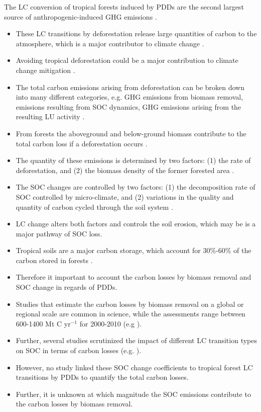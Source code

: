 	The \ac{LC} conversion of tropical forests induced by \acp{PDD} are the second largest source of anthropogenic-induced \ac{GHG} emissions \citep{Don2010}. 
	\begin{itemize}
		\item These \ac{LC} transitions by deforestation release large quantities of carbon to the atmosphere, which is a major contributor to climate change .
		\item Avoiding tropical deforestation could be a major contribution to climate change mitigation \citep{Don2010}.
		\item The total carbon emissions arising from deforestation can be broken down into many different categories, e.g. \ac{GHG} emissions from biomass removal, emissions resulting from \ac{SOC} dynamics, \ac{GHG} emissions arising from the resulting \ac{LU} activity \citep{Avitabile2016}.
		\item From forests the aboveground and below-ground biomass contribute to the total carbon loss if a deforestation occurs .
		\item The quantity of these emissions is determined by two factors: (1) the rate of deforestation, and (2) the biomass density of the former forested area \citep{Houghton2012a}.
		\item The \ac{SOC} changes are controlled by two factors: (1) the decomposition rate of \ac{SOC} controlled by micro-climate, and (2) variations in the quality and quantity of carbon cycled through the soil system \citep{Don2010}.
		\item \ac{LC} change alters both factors and controls the soil erosion, which may be is a major pathway of \ac{SOC} loss.
		\item Tropical soils are a major carbon storage, which account for 30\%-60\% of the carbon stored in forests \citep{Don2010}.
		\item Therefore it important to account the carbon losses by biomass removal and \ac{SOC} change in regards of \acp{PDD}.
		\item Studies that estimate the carbon losses by biomass removal on a global or regional scale are common in science, while the assessments range between 600-1400 Mt C yr$^{-1}$ for 2000-2010 (e.g \citet{Houghton2012,Achard2014,Sy2015,Baccini2012}).
		\item Further, several studies scrutinized the impact of different \ac{LC} transition types on \ac{SOC} in terms of carbon losses (e.g. \citet{Don2010,Rahman2018,Villarino2017}).
		\item However, no study linked these \ac{SOC} change coefficients to tropical forest \ac{LC} transitions by \acp{PDD} to quantify the total carbon losses.
		\item Further, it is unknown at which magnitude the \ac{SOC} emissions contribute to the carbon losses by biomass removal.
	\end{itemize}

